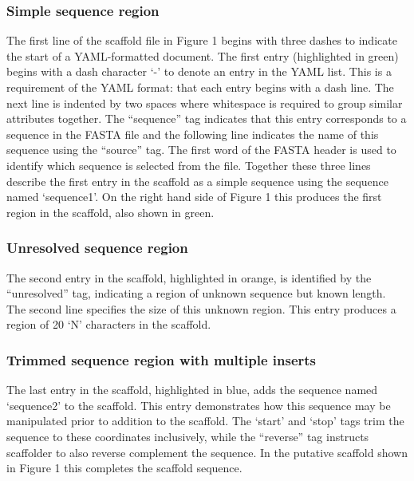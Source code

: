 \documentclass[10pt]{bmc_article}
\newenvironment{bmcformat}{\begin{raggedright}\baselineskip20pt\sloppy\setboolean{publ}{false}}{\end{raggedright}\baselineskip20pt\sloppy}
\begin{document}
\begin{bmcformat}
\subsubsection*{Simple sequence region} %

The first line of the scaffold file in Figure 1 begins with three dashes to
indicate the start of a YAML-formatted document. The first entry (highlighted
in green) begins with a dash character `-' to denote an entry in the YAML
list. This is a requirement of the YAML format: that each entry begins with
a dash line. The next line is indented by two spaces where whitespace is
required to group similar attributes together. The ``sequence'' tag indicates
that this entry corresponds to a sequence in the FASTA file and the following
line indicates the name of this sequence using the ``source'' tag. The first
word of the FASTA header is used to identify which sequence is selected from
the file. Together these three lines describe the first entry in the scaffold
as a simple sequence using the sequence named `sequence1'. On the right hand
side of Figure
1 this produces the first region in the scaffold, also shown in green. \pb

\subsubsection*{Unresolved sequence region} %

The second entry in the scaffold, highlighted in orange, is identified by the
``unresolved'' tag, indicating a region of unknown sequence but known length.
The second line specifies the size of this unknown region. This entry produces
a region of 20 `N' characters in the scaffold. \pb

\subsubsection*{Trimmed sequence region with multiple inserts} %

The last entry in the scaffold, highlighted in blue, adds the sequence named
`sequence2' to the scaffold. This entry demonstrates how this sequence may be
manipulated prior to addition to the scaffold. The `start' and `stop' tags trim
the sequence to these coordinates inclusively, while the ``reverse'' tag
instructs scaffolder to also reverse complement the sequence. In the putative
scaffold shown in Figure 1 this completes the scaffold sequence. \pb


\end{bmcformat}
\end{document}
